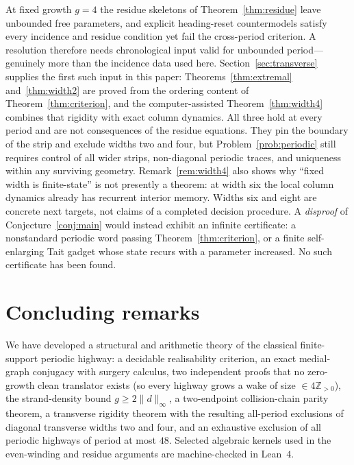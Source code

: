 \documentclass[11pt,reqno]{amsart}
\theoremstyle{plain}
\theoremstyle{definition}
\newcommand{\Z}{\mathbb{Z}}
\newcommand{\drift}{d}
\newcommand{\growth}{g}
\begin{document}
At fixed growth $\growth=4$ the residue skeletons of Theorem~\ref{thm:residue} leave
unbounded free parameters, and explicit heading-reset countermodels satisfy every
incidence and residue condition yet
fail the cross-period criterion. A resolution therefore needs chronological input
valid for unbounded period---genuinely more than the incidence data used here.
Section~\ref{sec:transverse} supplies the first such input in this paper:
Theorems~\ref{thm:extremal} and~\ref{thm:width2} are proved from the ordering content
of Theorem~\ref{thm:criterion}, and the computer-assisted
Theorem~\ref{thm:width4} combines that rigidity with exact column dynamics.  All
three hold at every period and are not consequences of the residue equations.  They
pin the boundary of the strip and exclude widths two and four, but
Problem~\ref{prob:periodic} still requires control of all wider strips, non-diagonal
periodic traces, and uniqueness within any surviving geometry.  Remark~\ref{rem:width4}
also shows why ``fixed width is finite-state'' is not presently a theorem: at width
six the local column dynamics already has recurrent interior memory.  Widths six and
eight are concrete next targets, not claims of a completed decision procedure.
A \emph{disproof} of Conjecture~\ref{conj:main} would
instead exhibit an infinite certificate: a nonstandard periodic word passing
Theorem~\ref{thm:criterion}, or a finite self-enlarging Tait gadget whose state recurs
with a parameter increased. No such certificate has been found.

\section{Concluding remarks}\label{sec:conclusion}

We have developed a structural and arithmetic theory of the classical
finite-support periodic highway: a decidable realisability criterion, an exact
medial-graph conjugacy with surgery calculus, two independent proofs that no
zero-growth clean translator exists (so every highway grows a wake of size
$\in4\Z_{>0}$), the strand-density bound $\growth\ge2\|\drift\|_\infty$, a
two-endpoint collision-chain parity theorem, a transverse rigidity theorem with the
resulting all-period exclusions of diagonal transverse widths two and four, and an
exhaustive exclusion of all periodic highways of period at most $48$. Selected
algebraic kernels used in the even-winding and residue arguments are machine-checked
in Lean~$4$.
\end{document}
